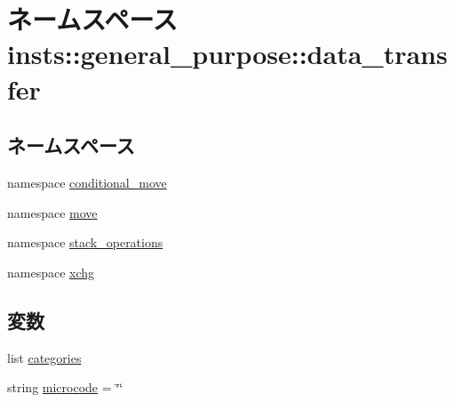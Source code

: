 \hypertarget{namespaceinsts_1_1general__purpose_1_1data__transfer}{
\section{ネームスペース insts::general\_\-purpose::data\_\-transfer}
\label{namespaceinsts_1_1general__purpose_1_1data__transfer}
}
\subsection*{ネームスペース}
\begin{DoxyCompactItemize}
\item 
namespace \hyperlink{namespaceinsts_1_1general__purpose_1_1data__transfer_1_1conditional__move}{conditional\_\-move}
\item 
namespace \hyperlink{namespaceinsts_1_1general__purpose_1_1data__transfer_1_1move}{move}
\item 
namespace \hyperlink{namespaceinsts_1_1general__purpose_1_1data__transfer_1_1stack__operations}{stack\_\-operations}
\item 
namespace \hyperlink{namespaceinsts_1_1general__purpose_1_1data__transfer_1_1xchg}{xchg}
\end{DoxyCompactItemize}
\subsection*{変数}
\begin{DoxyCompactItemize}
\item 
list \hyperlink{namespaceinsts_1_1general__purpose_1_1data__transfer_a273cf0f1630af14c1582f05e53354a55}{categories}
\item 
string \hyperlink{namespaceinsts_1_1general__purpose_1_1data__transfer_a770f11a173e99389a8802f0107ed8f52}{microcode} = \char`\"{}\char`\"{}
\end{DoxyCompactItemize}


